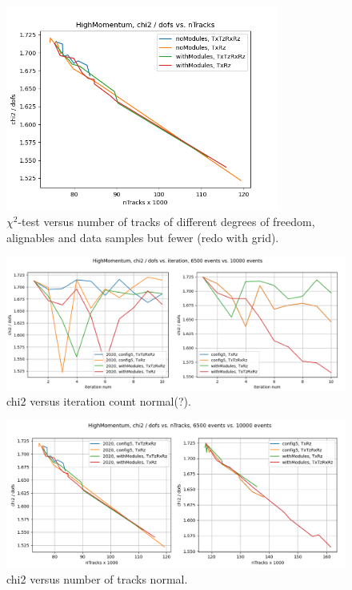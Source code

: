 \begin{figure}
  \centering
  \includegraphics[width=0.8\textwidth]{plots/nov_21/chi2_vs_ntracks_all.png}
  \caption{$\chi^2$-test versus number of tracks of different degrees of freedom, alignables and data samples but fewer (redo with grid).}
  \label{fig:chi2tracks}
\end{figure}

\begin{figure}
  \centering
  \includegraphics[width=\textwidth]{plots/LHCB_week_dec/chi2_vs_iter_normal.png}
  \caption{chi2 versus iteration count normal(?).}
  \label{fig:chi2iterdec}
\end{figure}

\begin{figure}
  \centering
  \includegraphics[width=\textwidth]{plots/LHCB_week_dec/chi2_vs_tracks_normal.png}
  \caption{chi2 versus number of tracks normal.}
  \label{fig:chi2tracksdec}
\end{figure}

